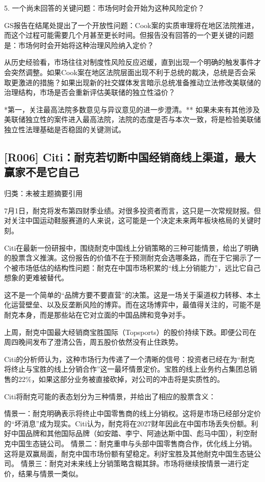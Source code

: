 \documentclass[11pt]{ctexart}
\begin{document}
5. 一个尚未回答的关键问题：市场何时会开始为这种风险定价？

GS报告在结尾处提出了一个开放性问题：Cook案的实质审理将在地区法院推进，而这个过程可能需要几个月甚至更长时间。但报告没有回答的一个更关键的问题是：市场何时会开始将这种治理风险纳入定价？

从历史经验看，市场往往对制度性风险反应迟缓，直到出现一个明确的触发事件才会突然调整。如果Cook案在地区法院层面出现不利于总统的裁决，总统是否会采取更激进的措施？如果出现新的社交媒体发言暗示总统准备推动立法修改美联储的治理结构，市场是否会重新评估美联储的独立性溢价？

*第一，关注最高法院多数意见与异议意见的进一步澄清。** 如果未来有其他涉及美联储独立性的案件进入最高法院，法院的态度是否与本次一致，将是检验美联储独立性法理基础是否稳固的关键测试。

\subsection{[R006] Citi：耐克若切断中国经销商线上渠道，最大赢家不是它自己}
{\small\color{refgray}归类：未被主题摘要引用}

7月1日，耐克将发布第四财季业绩。对很多投资者而言，这只是一次常规财报。但对关注中国运动鞋服赛道的人来说，这可能是一个决定未来两年板块格局的关键时刻。

Citi在最新一份研报中，围绕耐克中国线上分销策略的三种可能情景，给出了明确的股票含义推演。这份报告的价值不在于预测耐克会选哪条路，而在于它揭示了一个被市场低估的结构性问题：耐克在中国市场积累的“线上分销能力”，远比它自己想象的更难被替代。

这不是一个简单的“品牌方要不要直营”的决策。这是一场关于渠道权力转移、本土化运营壁垒、以及反垄断风险的博弈。而在这场博弈中，最值得关注的，可能不是耐克本身，而是那些站在它对立面的中国品牌和竞争对手。

上周，耐克中国最大经销商宝胜国际（Topsports）的股价持续下跌。即便公司在周四晚间发布了澄清公告，周五股价依然没有止住跌势。

Citi的分析师认为，这种市场行为传递了一个清晰的信号：投资者已经在为“耐克将终止与宝胜的线上分销合作”这一最坏情景定价。宝胜的线上业务约占集团总销售的22\%，如果这部分业务被直接砍掉，对公司的冲击将是实质性的。

Citi将耐克可能的表态划分为三种情景，并给出了相应的股票含义：

情景一：耐克明确表示将终止中国零售商的线上分销权。这将是市场已经部分定价的“坏消息”成为现实。Citi认为，耐克将在2027财年因此在中国市场丢失份额。利好中国品牌和其他国际品牌（如安踏、李宁、阿迪达斯中国、彪马中国），利空耐克中国生态链公司。 情景二：耐克重申与头部中国零售商合作，优化线上分销。这将是双赢局面，耐克中国市场份额有望稳定。利好宝胜及其他耐克中国生态链公司。 情景三：耐克对未来线上分销策略含糊其辞。市场将继续按情景一进行定价，结果与情景一类似。
\end{document}
